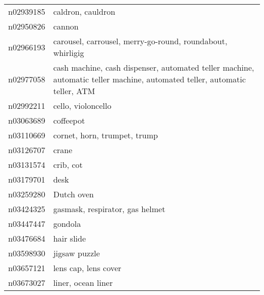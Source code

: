 \begin{appendices}
{\begin{footnotesize}
\begin{longtabu}{X|X[4]}
    		n02939185 &                                                                                                          caldron, cauldron \tabularnewline
    		n02950826 &                                                                                                                     cannon \tabularnewline
    		n02966193 &                                                                 carousel, carrousel, merry-go-round, roundabout, whirligig \tabularnewline
    		n02977058 &  cash machine, cash dispenser, automated teller machine, automatic teller machine, automated teller, automatic teller, ATM \tabularnewline
    		n02992211 &                                                                                                         cello, violoncello \tabularnewline
    		n03063689 &                                                                                                                  coffeepot \tabularnewline
    		n03110669 &                                                                                               cornet, horn, trumpet, trump \tabularnewline
    		n03126707 &                                                                                                                      crane \tabularnewline
    		n03131574 &                                                                                                                  crib, cot \tabularnewline
    		n03179701 &                                                                                                                       desk \tabularnewline
    		n03259280 &                                                                                                                 Dutch oven \tabularnewline
    		n03424325 &                                                                                            gasmask, respirator, gas helmet \tabularnewline
    		n03447447 &                                                                                                                    gondola \tabularnewline
    		n03476684 &                                                                                                                 hair slide \tabularnewline
    		n03598930 &                                                                                                              jigsaw puzzle \tabularnewline
    		n03657121 &                                                                                                       lens cap, lens cover \tabularnewline
    		n03673027 &                                                                                                         liner, ocean liner \tabularnewline

\end{longtabu}
\end{footnotesize}}
\end{appendices}
